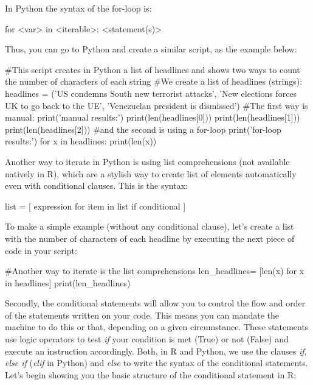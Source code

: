 In Python the syntax of the for-loop is:

\begin{examplepy}
for <var> in <iterable>:
    <statement(s)>
\end{examplepy}

Thus, you can go to Python and create a similar script, as the example below:

\begin{examplepy}
#This script creates in Python a list of headlines and shows two ways to count the number of characters of each string
#We create a list of headlines (strings):
headlines = ('US condemns South new terrorist  attacks', 'New elections forces UK to go back to the UE', 'Venezuelan president is dismissed') 
#The first way is manual:
print('manual results:')
print(len(headlines[0]))
print(len(headlines[1]))
print(len(headlines[2]))
#and the second is using a for-loop
print('for-loop results:')
for x in headlines:
    print(len(x))
\end{examplepy}

Another way to iterate in Python is using list comprehensions  (not available natively in R), which are a stylish way to create list of elements automatically even with conditional clauses. This is the syntax:

\begin{examplepy}
list  = [ expression for item in list if conditional ]
\end{examplepy}

To make a simple example (without any conditional clause), let's create a list with the number of characters of each headline by executing the next piece of code in your script:

\begin{examplepy}
#Another way to iterate is the list comprehensions
len_headlines= [len(x) for x in headlines]
print(len_headlines)
\end{examplepy}

Secondly, the conditional statements will allow you to control the flow and order of the statements written on your code. This means you can mandate the machine to do this or that, depending on a given circumstance. These statements use logic operators to test \emph{if} your condition is met (True) or not (False) and execute an instruction accordingly. Both, in R and Python, we use the clauses \emph{if}, \emph{else if} (\emph{elif} in Python) and \emph{else} to write the syntax of the conditional statements. Let's begin showing you the basic structure of the conditional statement in R:

